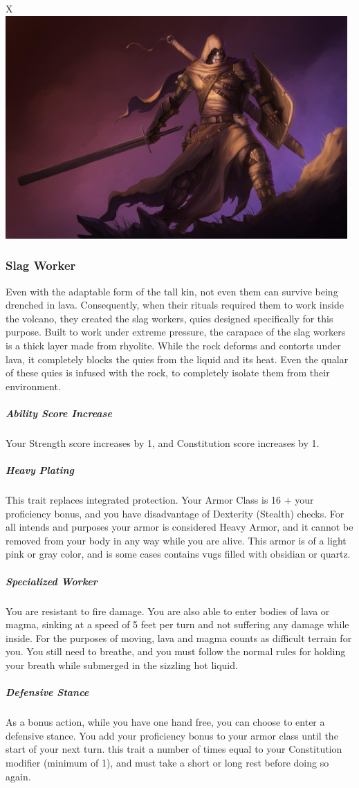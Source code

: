 \begin{linenumbers}
\begin{table}[b]%
    \begin{DndTable}[width=\linewidth]{X}
        \includegraphics[width=0.98\textwidth]{02kins/img/21quies_executioner.jpg}
    \end{DndTable}
\end{table}

\subsubsection{Slag Worker}
Even with the adaptable form of the tall kin, not even them can survive being drenched in lava.
Consequently, when their rituals required them to work inside the volcano, they created the slag workers, quies designed specifically for this purpose.
Built to work under extreme pressure, the carapace of the slag workers is a thick layer made from rhyolite.
While the rock deforms and contorts under lava, it completely blocks the quies from the liquid and its heat.
Even the qualar of these quies is infused with the rock, to completely isolate them from their environment.
\subparagraph{Ability Score Increase} Your Strength score increases by 1, and Constitution score increases by 1.
\subparagraph{Heavy Plating} This trait replaces integrated protection.
Your Armor Class is 16 + your proficiency bonus, and you have disadvantage of Dexterity (Stealth) checks.
For all intends and purposes your armor is considered Heavy Armor, and it cannot be removed from your body in any way while you are alive.
This armor is of a light pink or gray color, and is some cases contains vugs filled with obsidian or quartz.
\subparagraph{Specialized Worker} You are resistant to fire damage.
You are also able to enter bodies of lava or magma, sinking at a speed of 5 feet per turn and not suffering any damage while inside.
For the purposes of moving, lava and magma counts as difficult terrain for you.
You still need to breathe, and you must follow the normal rules for holding your breath while submerged in the sizzling hot liquid.
\subparagraph{Defensive Stance} As a bonus action, while you have one hand free, you can choose to enter a defensive stance.
You add your proficiency bonus to your armor class until the start of your next turn.
this trait a number of times equal to your Constitution modifier (minimum of 1), and must take a short or long rest before doing so again.
\end{linenumbers}

